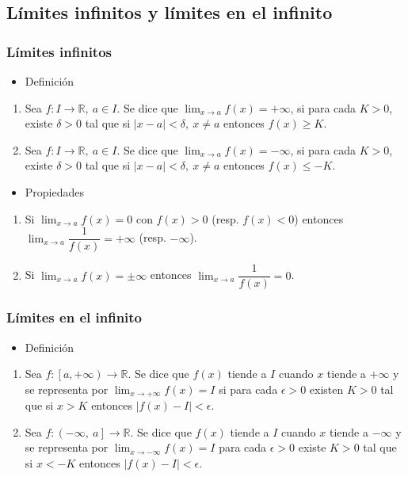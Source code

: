 \subsection{Límites infinitos y límites en el infinito}
\subsubsection{Límites infinitos}
\begin{itemize}[label=\color{red}\textbullet, leftmargin=*]
	\item \color{lightblue}Definición
\end{itemize}
\begin{enumerate}[label=\arabic*)]
	\item Sea $f:I\rightarrow\mathbb{R},~a\in I$. Se dice que $\lim_{x\to a}f(x)=+\infty$, si para cada $K>0$, existe $\delta>0$ tal que si $|x-a|<\delta,~x\neq a$ entonces $f(x)\ge K$.
	\item  Sea $f:I\rightarrow\mathbb{R},~a\in I$. Se dice que $\lim_{x\to a}f(x)=-\infty$, si para cada $K>0$, existe $\delta>0$ tal que si $|x-a|<\delta,~x\neq a$ entonces $f(x)\le -K$.
\end{enumerate}
\begin{itemize}[label=\color{red}\textbullet, leftmargin=*]
	\item \color{lightblue}Propiedades
\end{itemize}
\begin{enumerate}[label=\arabic*)]
	\item Si $\lim_{x\to a}f(x)=0$ con $f(x)>0$ (resp. $f(x)<0$) entonces $\lim_{x\to a}\dfrac{1}{f(x)}=+\infty$ (resp. $-\infty$).
	\item Si $\lim_{x\to a}f(x)=\pm\infty$ entonces $\lim_{x\to a}\dfrac{1}{f(x)}=0$.
\end{enumerate}
\subsubsection{Límites en el infinito}
\begin{itemize}[label=\color{red}\textbullet, leftmargin=*]
	\item \color{lightblue}Definición
\end{itemize}
\begin{enumerate}[label=\arabic*)]
	\item Sea $f:\left[a,+\infty\right)\rightarrow\mathbb{R}$. Se dice que $f(x)$ tiende a $I$ cuando $x$ tiende a $+\infty$ y se representa por $\lim_{x\to+\infty}f(x)=I$ si para cada $\epsilon>0$ existen $K>0$ tal que si $x>K$ entonces $\left|f(x)-I\right|<\epsilon$.
	\item Sea $f:\left(-\infty,~a\right]\rightarrow\mathbb{R}$. Se dice que $f(x)$ tiende a $I$ cuando $x$ tiende a $-\infty$ y se representa por $\lim_{x\to-\infty}f(x)=I$ para cada $\epsilon>0$ existe $K>0$ tal que si $x<-K$ entonces $\left|f(x)-I\right|<\epsilon$.
\end{enumerate}
